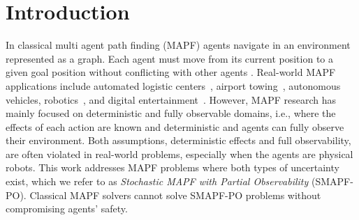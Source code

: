 \documentclass[letterpaper]{article} %
\newcommand{\plan}[1]{{\textcolor{blue}{[Plan: #1]}}}
\newcommand{\inon}[1]{ }
\begin{document}


\section{Introduction}

In classical multi agent path finding (MAPF) agents navigate in an environment represented as a graph.  Each agent must move from its current position to a given goal position without conflicting with other agents \cite{stern2019mapf}.
Real-world MAPF applications include automated logistic centers~\cite{wurman2008coordinating,salzman2020research}, airport towing~\cite{morris2016planning}, autonomous vehicles, robotics~\cite{veloso2015cobots}, and digital entertainment~\cite{ma2017feasibility}. However, MAPF research has mainly focused on deterministic and fully observable domains, i.e., where the effects of each action are known and deterministic and agents can fully observe their environment. 
Both assumptions, deterministic effects and full observability, are often violated in real-world problems, especially when the agents are physical robots. 
This work addresses MAPF problems where both types of uncertainty exist, which we refer to as \emph{Stochastic MAPF with Partial Observability} (SMAPF-PO). 
Classical MAPF solvers cannot solve SMAPF-PO problems without compromising agents' safety. 



\end{document}

